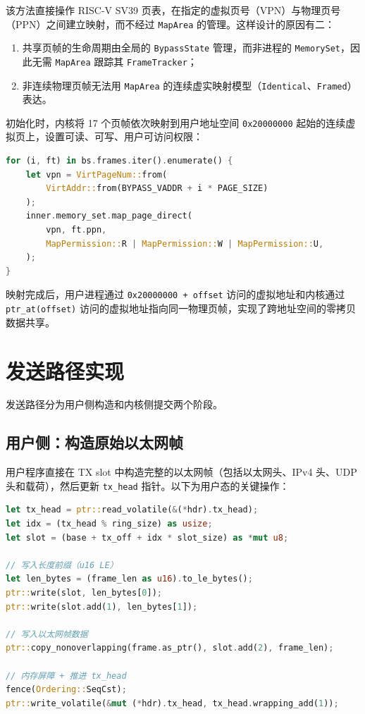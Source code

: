 该方法直接操作 RISC-V SV39 页表，在指定的虚拟页号（VPN）与物理页号（PPN）之间建立映射，而不经过 \texttt{MapArea} 的管理。这样设计的原因有二：
\begin{enumerate}
    \item 共享页帧的生命周期由全局的 \texttt{BypassState} 管理，而非进程的 \texttt{MemorySet}，因此无需 \texttt{MapArea} 跟踪其 \texttt{FrameTracker}；
    \item 非连续物理页帧无法用 \texttt{MapArea} 的连续虚实映射模型（\texttt{Identical}、\texttt{Framed}）表达。
\end{enumerate}

初始化时，内核将 17 个页帧依次映射到用户地址空间 \texttt{0x20000000} 起始的连续虚拟页上，设置可读、可写、用户可访问权限：

\begin{lstlisting}[language=Rust, caption={共享缓冲区映射到用户地址空间}]
for (i, ft) in bs.frames.iter().enumerate() {
    let vpn = VirtPageNum::from(
        VirtAddr::from(BYPASS_VADDR + i * PAGE_SIZE)
    );
    inner.memory_set.map_page_direct(
        vpn, ft.ppn,
        MapPermission::R | MapPermission::W | MapPermission::U,
    );
}
\end{lstlisting}

映射完成后，用户进程通过 \texttt{0x20000000 + offset} 访问的虚拟地址和内核通过 \texttt{ptr\_at(offset)} 访问的虚拟地址指向同一物理页帧，实现了跨地址空间的零拷贝数据共享。

\section{发送路径实现}

发送路径分为用户侧构造和内核侧提交两个阶段。

\subsection{用户侧：构造原始以太网帧}

用户程序直接在 TX slot 中构造完整的以太网帧（包括以太网头、IPv4 头、UDP 头和载荷），然后更新 \texttt{tx\_head} 指针。以下为用户态的关键操作：

\begin{lstlisting}[language=Rust, caption={用户态发包：写入 TX slot 并推进 head 指针}]
let tx_head = ptr::read_volatile(&(*hdr).tx_head);
let idx = (tx_head % ring_size) as usize;
let slot = (base + tx_off + idx * slot_size) as *mut u8;

// 写入长度前缀（u16 LE）
let len_bytes = (frame_len as u16).to_le_bytes();
ptr::write(slot, len_bytes[0]);
ptr::write(slot.add(1), len_bytes[1]);

// 写入以太网帧数据
ptr::copy_nonoverlapping(frame.as_ptr(), slot.add(2), frame_len);

// 内存屏障 + 推进 tx_head
fence(Ordering::SeqCst);
ptr::write_volatile(&mut (*hdr).tx_head, tx_head.wrapping_add(1));
\end{lstlisting}

